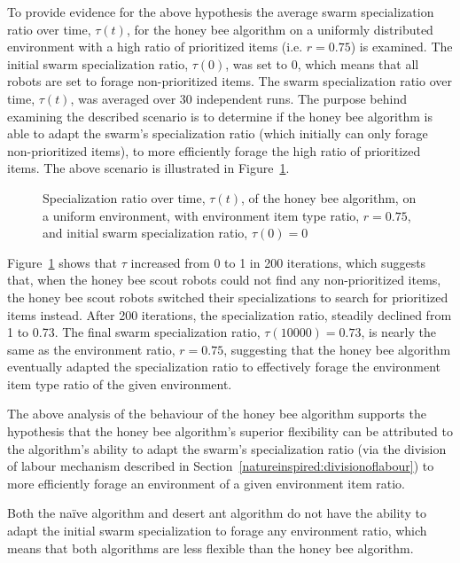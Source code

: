 To provide evidence for the above hypothesis the average swarm specialization ratio over time, $\tau(t)$, for the honey bee algorithm on a uniformly distributed environment with a high ratio of prioritized items (i.e. $r = 0.75$) is examined. The initial swarm specialization ratio, $\tau(0)$, was set to 0, which means that all robots are set to forage non-prioritized items. The swarm specialization ratio over time, $\tau(t)$, was averaged over 30 independent runs. The purpose behind examining the described scenario is to determine if the honey bee algorithm is able to adapt the swarm's specialization ratio (which initially can only forage non-prioritized items), to more efficiently forage the high ratio of prioritized items. The above scenario is illustrated in Figure~\ref{fig:specializationratioovertime}. 


\begin{figure}[!htb]
\centering
\resizebox{\textwidth}{!}{}
\caption{Specialization ratio over time, $\tau(t)$, of the honey bee algorithm, on a uniform environment, with environment item type ratio, $r=0.75$, and initial swarm specialization ratio, $\tau(0)=0$}
\label{fig:specializationratioovertime}
\end{figure}

Figure~\ref{fig:specializationratioovertime} shows that $\tau$ increased from 0 to 1 in 200 iterations, which suggests that, when the honey bee scout robots could not find any non-prioritized items, the honey bee scout robots switched their specializations to search for prioritized items instead. After 200 iterations, the specialization ratio, steadily declined from 1 to 0.73. The final swarm specialization ratio, $\tau(10000)=0.73$, is nearly the same as the environment ratio, $r=0.75$, suggesting that the honey bee algorithm eventually adapted the specialization ratio to effectively forage the environment item type ratio of the given environment.

The above analysis of the behaviour of the honey bee algorithm supports the hypothesis that the honey bee algorithm's superior flexibility can be attributed to the algorithm's ability to adapt the swarm's specialization ratio (via the division of labour mechanism described in Section~\ref{natureinspired:divisionoflabour}) to more efficiently forage an environment of a given environment item ratio.

Both the na\"ive algorithm and desert ant algorithm do not have the ability to adapt the initial swarm specialization to forage any environment ratio, which means that both algorithms are  less flexible than the honey bee algorithm. 

